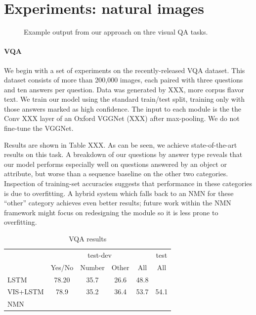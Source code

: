 \section{Experiments: natural images}

\begin{figure}
  \caption{Example output from our approach on thre visual QA tasks.}
\end{figure}

\paragraph{VQA}
We begin with a set of experiments on the recently-released VQA dataset. This
dataset consists of more than 200,000 images, each paired with three questions
and ten answers per question. Data was generated by XXX, more corpus flavor
text. We train our model using the standard train/test split, training only with
those answers marked as high confidence.
The input to each  module is the the Conv XXX layer of an Oxford
VGGNet (XXX) after max-pooling. We do not fine-tune the VGGNet.

Results are shown in Table XXX. As can be seen, we achieve state-of-the-art
results on this task. A breakdown of our questions by answer type reveals that
our model performs especially well on questions answered by an object or
attribute, but worse than a sequence baseline on the other two categories.
Inspection of training-set accuracies suggests that performance in these
categories is due to overfitting. A hybrid system which falls back to an NMN
for these ``other'' category achieves even better results; future work within
the NMN framework might focus on redesigning the  module
so it is less prone to overfitting.

\begin{table}
  \footnotesize
  \center
  \begin{tabular}{lccccc}
    \toprule
    & \multicolumn{4}{c}{test-dev} & test \\
    \cmidrule(lr){2-5} \cmidrule(lr){6-6}
    & Yes/No & Number & Other & All & All \\
    \midrule
    LSTM & 78.20 & 35.7 & 26.6 & 48.8 \\
    VIS+LSTM & 78.9 & 35.2 & 36.4 & 53.7 & 54.1 \\
    NMN & \\
    \bottomrule
  \end{tabular}
  \caption{VQA results}
\end{table}

